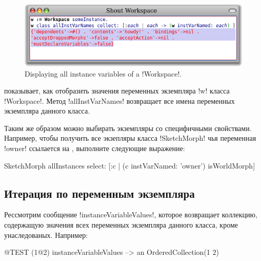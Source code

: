 \documentclass[a4paper,10pt,twoside]{book}
\begin{document}
\begin{figure}[ht]\centering
	\includegraphics[width=\linewidth]{allInstanceVariables}
	\caption{Displaying all instance variables of a \ct!Workspace!.}
\end{figure}

 показывает, как отобразить значения переменных экземпляра \ct!w! класса \ct!Workspace!.
Метод \ct!allInstVarNames! возвращает все имена переменных экземпляра данного класса.

Таким же образом можно выбирать экземпляры со специфичными свойствами.
Например, чтобы получить все экзепляры класса \ct!SketchMorph! чья переменная \ct!owner! ссылается на , выполните следующие выражение:
\begin{code}{}
SketchMorph allInstances select: [:c | (c instVarNamed: 'owner') isWorldMorph]
\end{code}

\subsection{Итерация по переменным экземпляра}

Рессмотрим сообщение \ct!instanceVariableValues!, которое возвращает коллекцию, содержащую значения всех переменных экземпляра данного класса, кроме унаследованых.
Например:
\begin{code}{@TEST}
(1@2) instanceVariableValues --> an OrderedCollection(1 2)
\end{code}
\end{document}
